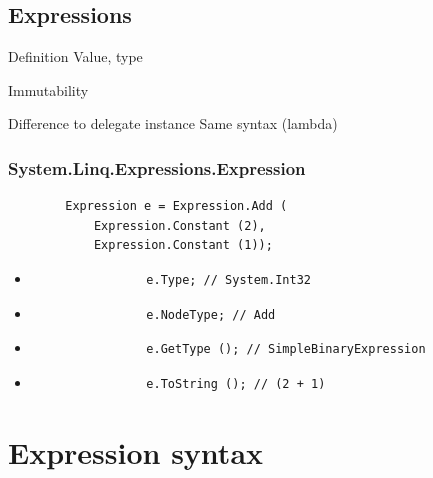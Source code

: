 \documentclass{beamer}
\begin{document}
\subsection{Expressions}
	\begin{frame}
		Definition
		Value, type
	\end{frame}
	\begin{frame}
		Immutability
	\end{frame}
	\begin{frame}
		Difference to delegate instance
		Same syntax (lambda)
	\end{frame}
	\begin{frame}[fragile]
		\frametitle{System.Linq.Expressions.Expression}
		\begin{verbatim}
		Expression e = Expression.Add (
		    Expression.Constant (2),
		    Expression.Constant (1));
		\end{verbatim}
		\pause
		\begin{itemize}
			\item
				\begin{verbatim}
				e.Type; // System.Int32
				\end{verbatim}
			\pause
			\item
				\begin{verbatim}
				e.NodeType; // Add
				\end{verbatim}
			\pause
			\item
				\begin{verbatim}
				e.GetType (); // SimpleBinaryExpression
				\end{verbatim}
			\pause
			\item
				\begin{verbatim}
				e.ToString (); // (2 + 1)
				\end{verbatim}
		\end{itemize}
	\end{frame}

\section{Expression syntax}
\end{document}
